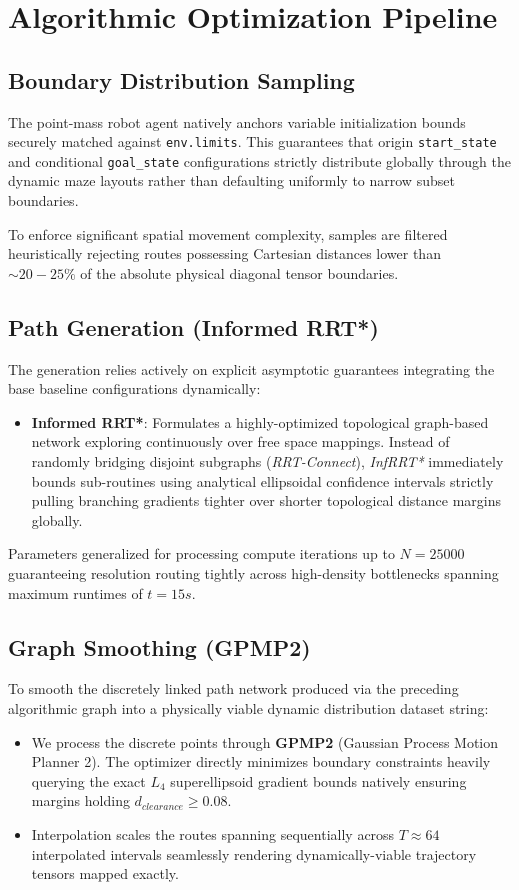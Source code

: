 \documentclass[11pt]{article}
\begin{document}
\section{Algorithmic Optimization Pipeline}

\subsection{Boundary Distribution Sampling}
The point-mass robot agent natively anchors variable initialization bounds securely matched against \texttt{env.limits}. This guarantees that origin \texttt{start\_state} and conditional \texttt{goal\_state} configurations strictly distribute globally through the dynamic maze layouts rather than defaulting uniformly to narrow subset boundaries.

To enforce significant spatial movement complexity, samples are filtered heuristically rejecting routes possessing Cartesian distances lower than $\sim 20-25\%$ of the absolute physical diagonal tensor boundaries.

\subsection{Path Generation (Informed RRT*)}
The generation relies actively on explicit asymptotic guarantees integrating the base baseline configurations dynamically:
\begin{itemize}
    \item \textbf{Informed RRT*}: Formulates a highly-optimized topological graph-based network exploring continuously over free space mappings. Instead of randomly bridging disjoint subgraphs (\textit{RRT-Connect}), \textit{InfRRT*} immediately bounds sub-routines using analytical ellipsoidal confidence intervals strictly pulling branching gradients tighter over shorter topological distance margins globally.
\end{itemize}
Parameters generalized for processing compute iterations up to $N = 25000$ guaranteeing resolution routing tightly across high-density bottlenecks spanning maximum runtimes of $t = 15s$.

\subsection{Graph Smoothing (GPMP2)}
To smooth the discretely linked path network produced via the preceding algorithmic graph into a physically viable dynamic distribution dataset string:
\begin{itemize}
    \item We process the discrete points through \textbf{GPMP2} (Gaussian Process Motion Planner 2). The optimizer directly minimizes boundary constraints heavily querying the exact $L_4$ superellipsoid gradient bounds natively ensuring margins holding $d_{clearance} \geq 0.08$. 
    \item Interpolation scales the routes spanning sequentially across $T \approx 64$ interpolated intervals seamlessly rendering dynamically-viable trajectory tensors mapped exactly.
\end{itemize}
\end{document}
